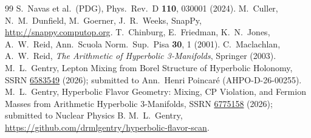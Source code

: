 \documentclass[11pt,a4paper]{article}
\theoremstyle{definition}
\theoremstyle{remark}
\begin{document}
\begin{thebibliography}{99}
S.~Navas et al.\ (PDG),
Phys.\ Rev.\ D \textbf{110}, 030001 (2024).
M.~Culler, N.~M.~Dunfield, M.~Goerner, J.~R.~Weeks,
SnapPy, \url{http://snappy.computop.org}.
T.~Chinburg, E.~Friedman, K.~N.~Jones, A.~W.~Reid,
Ann.\ Scuola Norm.\ Sup.\ Pisa \textbf{30}, 1 (2001).
C.~Maclachlan, A.~W.~Reid,
\emph{The Arithmetic of Hyperbolic 3-Manifolds}, Springer (2003).
M.~L.~Gentry,
Lepton Mixing from Borel Structure of Hyperbolic Holonomy,
SSRN \href{https://doi.org/10.2139/ssrn.6583549}{6583549} (2026);
submitted to Ann.\ Henri Poincar\'e (AHPO-D-26-00255).
M.~L.~Gentry,
Hyperbolic Flavor Geometry: Mixing, CP Violation, and Fermion
Masses from Arithmetic Hyperbolic 3-Manifolds,
SSRN \href{https://doi.org/10.2139/ssrn.6775158}{6775158} (2026);
submitted to Nuclear Physics B.
M.~L.~Gentry,
\url{https://github.com/drmlgentry/hyperbolic-flavor-scan}.
\end{thebibliography}
\end{document}
